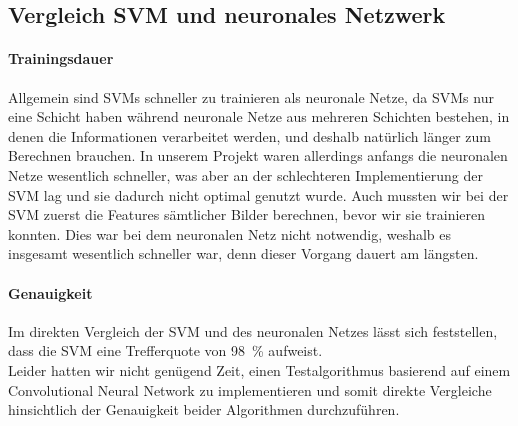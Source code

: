 \subsection{Vergleich SVM und neuronales Netzwerk}

\paragraph{Trainingsdauer}

Allgemein sind SVMs schneller zu trainieren als neuronale Netze, da SVMs nur eine Schicht haben während neuronale Netze aus mehreren Schichten bestehen, in denen die Informationen verarbeitet werden, und deshalb natürlich länger zum Berechnen brauchen. In unserem Projekt waren allerdings anfangs die neuronalen Netze wesentlich schneller, was aber an der schlechteren Implementierung der SVM lag und sie dadurch nicht optimal genutzt wurde. Auch mussten wir bei der SVM zuerst die Features sämtlicher Bilder berechnen, bevor wir sie trainieren konnten. Dies war bei dem neuronalen Netz nicht notwendig, weshalb es insgesamt wesentlich schneller war, denn dieser Vorgang dauert am längsten.

\paragraph{Genauigkeit}
Im direkten Vergleich der SVM und des neuronalen Netzes lässt sich feststellen, dass die SVM eine Trefferquote von 98~\% aufweist. \\
Leider hatten wir nicht genügend Zeit, einen Testalgorithmus basierend auf einem Convolutional Neural Network zu implementieren und somit direkte Vergleiche hinsichtlich der Genauigkeit beider Algorithmen durchzuführen.
